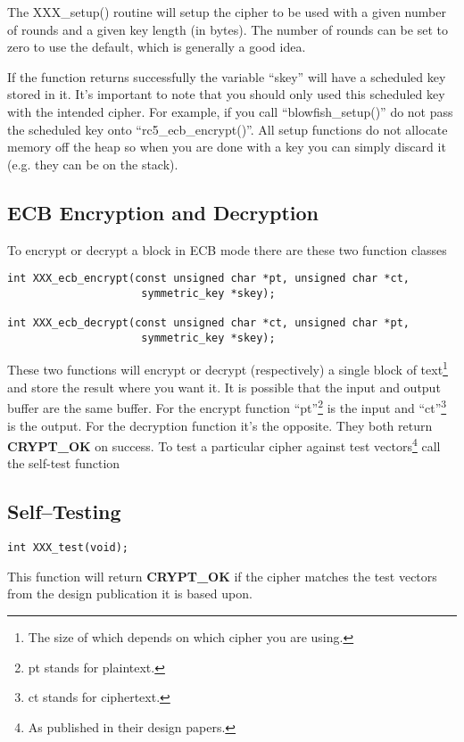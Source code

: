 \documentclass[a4paper]{book}
\begin{document}
The XXX\_setup() routine will setup the cipher to be used with a given number of rounds and a given key length (in bytes).
The number of rounds can be set to zero to use the default, which is generally a good idea.

If the function returns successfully the variable ``skey'' will have a scheduled key stored in it.  It's important to note
that you should only used this scheduled key with the intended cipher.  For example, if you call ``blowfish\_setup()'' do not 
pass the scheduled key onto ``rc5\_ecb\_encrypt()''.  All setup functions do not allocate memory off the heap so when you are 
done with a key you can simply discard it (e.g. they can be on the stack).

\subsection{ECB Encryption and Decryption}
To encrypt or decrypt a block in ECB mode there are these two function classes
 
\begin{verbatim}
int XXX_ecb_encrypt(const unsigned char *pt, unsigned char *ct,
                     symmetric_key *skey);

int XXX_ecb_decrypt(const unsigned char *ct, unsigned char *pt,
                     symmetric_key *skey);
\end{verbatim}
These two functions will encrypt or decrypt (respectively) a single block of text\footnote{The size of which depends on
which cipher you are using.} and store the result where you want it.  It is possible that the input and output buffer are 
the same buffer.  For the encrypt function ``pt''\footnote{pt stands for plaintext.} is the input and 
``ct''\footnote{ct stands for ciphertext.} is the output.  For the decryption function it's the opposite.  They both
return \textbf{CRYPT\_OK} on success.  To test a particular 
cipher against test vectors\footnote{As published in their design papers.} call the self-test function
 
\subsection{Self--Testing}
\begin{verbatim}
int XXX_test(void);
\end{verbatim}
This function will return {\bf CRYPT\_OK} if the cipher matches the test vectors from the design publication it is 
based upon.  
\end{document}
